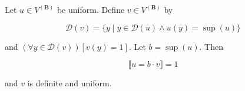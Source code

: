 Let $u \in V^{(\mathbf{B})}$ be uniform. Define $v \in V^{(\mathbf{B})}$ by

$$\mathcal{D}(v) = \{y \mid y \in \mathcal{D}(u) \land u(y) = \sup(u)\}$$

and $(\forall y \in \mathcal{D}(v))[v(y) = 1]$. Let $b = \sup(u)$. Then

$$\llbracket u = b \cdot v \rrbracket = 1$$

and $v$ is definite and uniform.
